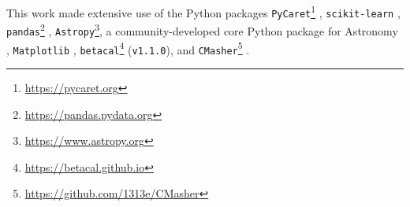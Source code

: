 \documentclass{aa}
\begin{document}
\begin{acknowledgements}
This work made extensive use of the Python packages \texttt{PyCaret}\footnote{\url{https://pycaret.org}} \citep[\texttt{v2.3.10};][]{PyCaret}, \texttt{scikit-learn} \citep[\texttt{v0.23.2};][]{scikit-learn}, \texttt{pandas}\footnote{\url{https://pandas.pydata.org}} \citep[\texttt{v1.4.2};][]{pandas}, \texttt{Astropy}\footnote{\url{https://www.astropy.org}}, a community-developed core Python package for Astronomy \citep[\texttt{v5.0};][]{astropy:2013, astropy:2018, 2022ApJ...935..167A}, \texttt{Matplotlib} \citep[\texttt{v3.5.1};][]{Hunter:2007}, \texttt{betacal}\footnote{\url{https://betacal.github.io}} (\texttt{v1.1.0}), and \texttt{CMasher}\footnote{\url{https://github.com/1313e/CMasher}} \citep[\texttt{v1.6.3};][]{2020JOSS....5.2004V}.
\end{acknowledgements}

%
%


\end{document}
